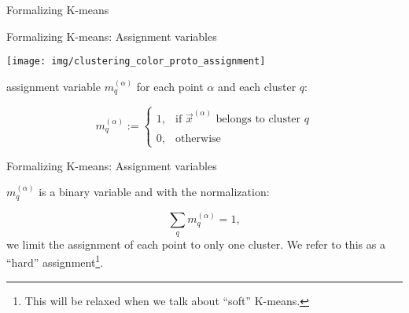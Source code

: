 \begin{frame}{Formalizing K-means}



\end{frame}

\begin{frame}{Formalizing K-means: Assignment variables}

\begin{center}
	\texttt{[image: img/clustering\_color\_proto\_assignment]}
\end{center}
	
 assignment variable $m_q^{(\alpha)}$ for each point $\alpha$ and each cluster $q$:

\begin{equation}
\label{eq:assignment}
	m_q^{(\alpha)} := \left\{ \begin{array}{ll}
		1, & \text{if } \vec{x}^{(\alpha)} \text{ belongs to cluster } q
		\\\\
		0, & \text{otherwise}
	\end{array} \right. 
\end{equation}


\end{frame}

\begin{frame}{Formalizing K-means: Assignment variables}


\pause

$m_q^{(\alpha)}$ is a binary variable and with the normalization:

\begin{equation}
    \label{eq:assignmentnormalization}
	\sum\limits_q m_q^{(\alpha)} = 1,
\end{equation}
we limit the assignment of each point to only one cluster. We refer to this as a ``hard'' assignment\footnote{This will be relaxed when we talk about ``soft'' K-means.}.

\end{frame}

